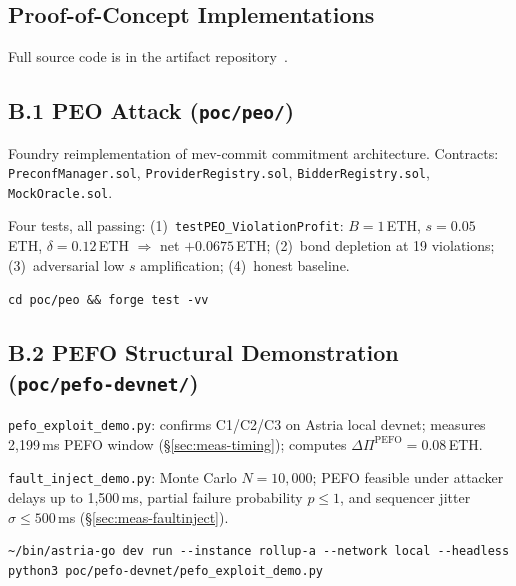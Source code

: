 
\subsection{Proof-of-Concept Implementations}
\label{app:poc}

Full source code is in the artifact repository~\cite{artifact-repo}.

\subsection*{B.1 PEO Attack (\texttt{poc/peo/})}

Foundry reimplementation of mev-commit commitment architecture.
Contracts: \texttt{PreconfManager.sol}, \texttt{ProviderRegistry.sol},
\texttt{BidderRegistry.sol}, \texttt{MockOracle.sol}.

Four tests, all passing: (1)~\texttt{testPEO\_ViolationProfit}:
$B=1$\,ETH, $s=0.05$\,ETH, $\delta=0.12$\,ETH $\Rightarrow$ net
$+0.0675$\,ETH; (2)~bond depletion at 19 violations;
(3)~adversarial low $s$ amplification; (4)~honest baseline.

\verb|cd poc/peo && forge test -vv|

\subsection*{B.2 PEFO Structural Demonstration (\texttt{poc/pefo-devnet/})}

\texttt{pefo\_exploit\_demo.py}: confirms C1/C2/C3 on Astria local devnet;
measures 2,199\,ms PEFO window (\S\ref{sec:meas-timing}); computes
$\Delta\Pi^{\text{PEFO}} = 0.08$\,ETH.

\texttt{fault\_inject\_demo.py}: Monte Carlo $N=10{,}000$; PEFO feasible
under attacker delays up to 1,500\,ms, partial failure probability
$p \leq 1$, and sequencer jitter $\sigma \leq 500$\,ms
(\S\ref{sec:meas-faultinject}).

\begin{verbatim}
~/bin/astria-go dev run --instance rollup-a --network local --headless
python3 poc/pefo-devnet/pefo_exploit_demo.py
\end{verbatim}
